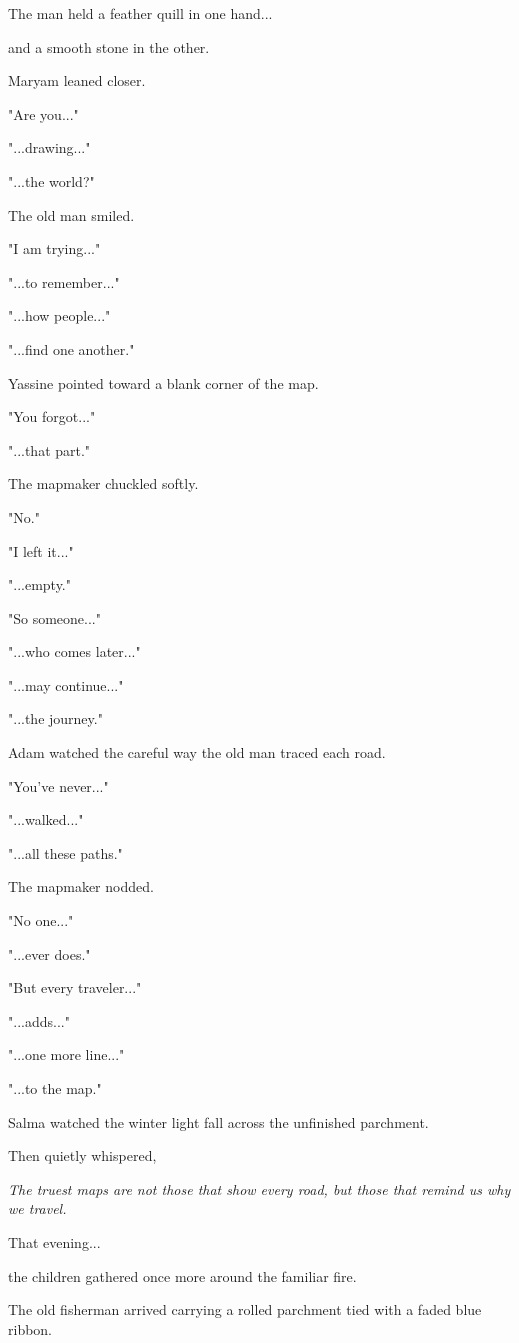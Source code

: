 \documentclass[12pt,openany]{book}
\begin{document}
The man held a feather quill in one hand...

and a smooth stone in the other.

Maryam leaned closer.

"Are you..."

"...drawing..."

"...the world?"

The old man smiled.

"I am trying..."

"...to remember..."

"...how people..."

"...find one another."

Yassine pointed toward a blank corner of the map.

"You forgot..."

"...that part."

The mapmaker chuckled softly.

"No."

"I left it..."

"...empty."

"So someone..."

"...who comes later..."

"...may continue..."

"...the journey."

Adam watched the careful way the old man traced each road.

"You've never..."

"...walked..."

"...all these paths."

The mapmaker nodded.

"No one..."

"...ever does."

"But every traveler..."

"...adds..."

"...one more line..."

"...to the map."

Salma watched the winter light fall across the unfinished parchment.

Then quietly whispered,

\emph{The truest maps are not those that show every road, but those that remind us why we travel.}

That evening...

the children gathered once more around the familiar fire.

The old fisherman arrived carrying a rolled parchment tied with a faded blue ribbon.
\end{document}
